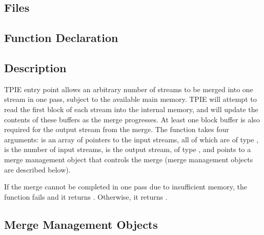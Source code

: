 


\subsection{Files}
  \btabb
     {}
  \etabb

\subsection{Function Declaration}
  \btabb
     {}
  \etabb

\subsection{Description}
TPIE entry point  allows an
arbitrary number of streams to be merged into one stream in one pass,
subject to the available main memory.  TPIE will attempt to read the
first block of each stream into the internal memory, and will update
the contents of these buffers as the merge progresses. At least one
block buffer is also required for the output stream from the merge.
The function takes four arguments:
 is an array of pointers to the input streams, all of
  which are of type ,
 is the number of input streams,
 is the output stream, of type , and
 points to a merge management object that controls the
  merge (merge management objects are described below).

If the merge cannot be completed in one pass due to insufficient
memory, the function fails and it returns
. Otherwise, it returns
.



\subsection{Merge Management Objects}\label{ssec:mmo}

